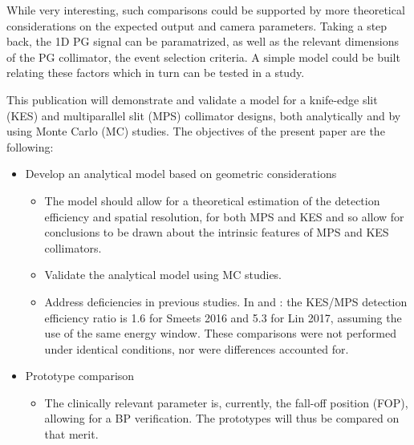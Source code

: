\documentclass[a4paper,english]{article}
\newcommand{\answ}[1]{\todo[linecolor=blue,backgroundcolor=blue!25,bordercolor=blue]{#1}}
\begin{document}
While very interesting, such comparisons could be supported by more theoretical considerations on the expected output and camera parameters. Taking a step back, the 1D PG signal can be paramatrized, as well as the relevant dimensions of the PG collimator, the event selection criteria. A simple model could be built relating these factors which in turn can be tested in a study.

This publication will demonstrate and validate a model for a knife-edge slit (KES) and multiparallel slit (MPS) collimator designs, both analytically and by using Monte Carlo (MC) studies. The objectives of the present paper are the following:

\begin{itemize}
  \item Develop an analytical model based on geometric considerations
  \begin{itemize}
  	\item The model should allow for a theoretical estimation of the detection efficiency and spatial resolution, for both MPS and KES and so allow for conclusions to be drawn about the intrinsic features of MPS and KES collimators.
    \item Validate the analytical model using MC studies.
    \item Address deficiencies in previous studies. In \cite{Smeets2016} and \cite{Lin2017}: the KES/MPS detection efficiency ratio is 1.6 for Smeets 2016 and 5.3 for Lin 2017, assuming the use of the same energy window\answ{I think so. Certainly for Smeets 2016}. These comparisons were not performed under identical conditions, nor were differences accounted for.
  \end{itemize}
  \item Prototype comparison
    \begin{itemize}
    	\item The clinically relevant parameter is, currently, the fall-off position (FOP), allowing for a BP verification. The prototypes will thus be compared on that merit.
    \end{itemize} 
  
\end{itemize}  

\end{document}
